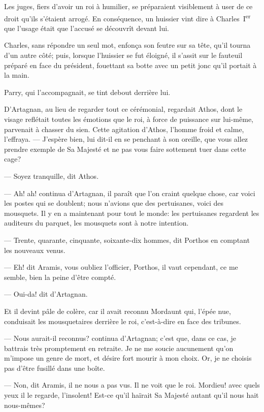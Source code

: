 Les juges, fiers d'avoir un roi à humilier, se préparaient visiblement à user de ce droit qu'ils s'étaient arrogé. En conséquence, un huissier vint dire à Charles~I\textsuperscript{er} que l'usage était que l'accusé se découvrît devant lui.

Charles, sans répondre un seul mot, enfonça son feutre sur sa tête, qu'il tourna d'un autre côté; puis, lorsque l'huissier se fut éloigné, il s'assit sur le fauteuil préparé en face du président, fouettant sa botte avec un petit jonc qu'il portait à la main.

Parry, qui l'accompagnait, se tint debout derrière lui.

D'Artagnan, au lieu de regarder tout ce cérémonial, regardait Athos, dont le visage reflétait toutes les émotions que le roi, à
force de puissance sur lui-même, parvenait à chasser du sien. Cette agitation d'Athos, l'homme froid et calme, l'effraya.
— J'espère bien, lui dit-il en se penchant à son oreille, que vous allez prendre exemple de Sa Majesté et ne pas vous faire sottement tuer dans cette cage?

— Soyez tranquille, dit Athos.

— Ah! ah! continua d'Artagnan, il paraît que l'on craint quelque chose, car voici les postes qui se doublent; nous n'avions que des pertuisanes, voici des mousquets. Il y en a maintenant pour tout le monde: les pertuisanes regardent les auditeurs du parquet, les mousquets sont à notre intention.

— Trente, quarante, cinquante, soixante-dix hommes, dit Porthos en comptant les nouveaux venus.

— Eh! dit Aramis, vous oubliez l'officier, Porthos, il vaut cependant, ce me semble, bien la peine d'être compté.

— Oui-da! dit d'Artagnan.

Et il devint pâle de colère, car il avait reconnu Mordaunt qui, l'épée nue, conduisait les mousquetaires derrière le roi, c'est-à-dire en face des tribunes.

— Nous aurait-il reconnus? continua d'Artagnan; c'est que, dans ce cas, je battrais très promptement en retraite. Je ne me soucie aucunement qu'on m'impose un genre de mort, et désire fort mourir à mon choix. Or, je ne choisis pas d'être fusillé dans une boîte.

— Non, dit Aramis, il ne nous a pas vus. Il ne voit que le roi. Mordieu! avec quels yeux il le regarde, l'insolent! Est-ce qu'il haïrait Sa Majesté autant qu'il nous hait nous-mêmes?

